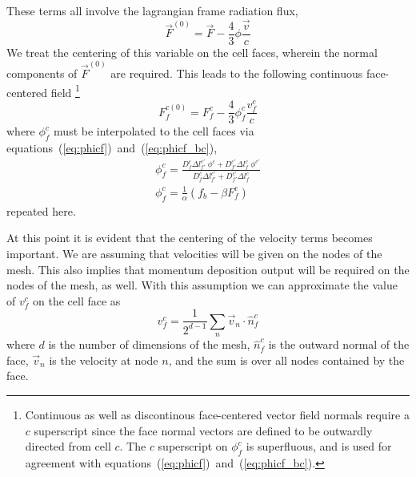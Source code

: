 \documentclass{article}
\newcommand{\bfunc}{\ensuremath{f_{b}}}
\begin{document}
These terms all involve the lagrangian frame radiation flux,
\begin{equation}
	\vec{F}^{(0)} = \vec{F} - \frac{4}{3} \phi \frac{\vec{v}}{c}
\end{equation}
We treat the centering of this variable on the cell faces, wherein the normal
components of $\vec{F}^{(0)}$ are required.
This leads to the following continuous face-centered field%
\footnote{%
   Continuous as well as discontinous
   face-centered vector field normals require a $c$ superscript
   since the face normal vectors are defined to be outwardly directed from
   cell $c$.
   The $c$ superscript on $\phi^{c}_{f}$ is superfluous, and is used
   for agreement with equations~(\ref{eq:phicf})~and~(\ref{eq:phicf_bc}).
}
\begin{equation}
  \boxed{
	F^{c(0)}_{f} = F^{c}_{f} - \frac{4}{3} \phi^{c}_{f} \frac{v^{c}_{f}}{c}
  }
\end{equation}
where $\phi^{c}_{f}$ must be interpolated to the cell faces
via equations~(\ref{eq:phicf})~and~(\ref{eq:phicf_bc}),
\begin{gather}
   \boxed{
	\phi^{c}_{f} =  \frac
			{ D^{c}_{f} \Delta l^{c'}_{f'} \; \phi^{c} 
			    + D^{c'}_{f'} \Delta l^{c}_{f} \; \phi^{c'} 
			}
			{ D^{c}_{f} \Delta l^{c'}_{f'}
			    + D^{c'}_{f'} \Delta l^{c}_{f}
			}
   } \\
   \boxed{
	\phi^{c}_{f} = \frac{1}{\alpha} \left( \bfunc - \beta F^{c}_{f} \right)
   }
\end{gather}
repeated here.

At this point it is evident that the centering of the velocity terms
becomes important.
We are assuming that velocities will be given on the nodes of the mesh.
This also implies that momentum deposition output will be required on
the nodes of the mesh, as well.
With this assumption we can approximate the value of $v^{c}_{f}$
on the cell face as
\begin{equation}
  \boxed{
     v^{c}_{f} = \frac{1}{2^{d-1}} \sum_{n} \vec{v}_{n} \cdot \hat{n}^{c}_{f}
  }
\end{equation}
where $d$ is the number of dimensions of the mesh,
$\hat{n}^{c}_{f}$ is the outward normal of the face,
$\vec{v}_{n}$ is the velocity at node $n$,
and the sum is over all nodes contained by the face.
\end{document}
